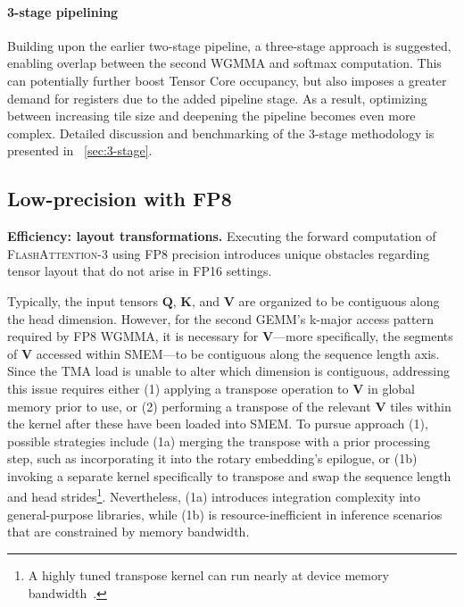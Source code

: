 \begin{enumerate}
\begin{algorithm}[H]
\begin{algorithmic}[1]
\paragraph{3-stage pipelining} Building upon the earlier two-stage pipeline, a three-stage approach is suggested, enabling overlap between the second WGMMA and softmax computation. This can potentially further boost Tensor Core occupancy, but also imposes a greater demand for registers due to the added pipeline stage. As a result, optimizing between increasing tile size and deepening the pipeline becomes even more complex. Detailed discussion and benchmarking of the 3-stage methodology is presented in ~\cref{sec:3-stage}.

\subsection{Low-precision with FP8}
\label{sec:algofp8}

\textbf{Efficiency: layout transformations.} Executing the forward computation of \textsc{FlashAttention-3} using FP8 precision introduces unique obstacles regarding tensor layout that do not arise in FP16 settings.

Typically, the input tensors $\mathbf{Q}$, $\mathbf{K}$, and $\mathbf{V}$ are organized to be contiguous along the head dimension. However, for the second GEMM’s k-major access pattern required by FP8 WGMMA, it is necessary for $\mathbf{V}$—more specifically, the segments of $\mathbf{V}$ accessed within SMEM—to be contiguous along the sequence length axis. Since the TMA load is unable to alter which dimension is contiguous, addressing this issue requires either (1) applying a transpose operation to $\mathbf{V}$ in global memory prior to use, or (2) performing a transpose of the relevant $\mathbf{V}$ tiles within the kernel after these have been loaded into SMEM. To pursue approach (1), possible strategies include (1a) merging the transpose with a prior processing step, such as incorporating it into the rotary embedding’s epilogue, or (1b) invoking a separate kernel specifically to transpose and swap the sequence length and head strides\footnote{A highly tuned transpose kernel can run nearly at device memory bandwidth~\citep{colfax_cutlass_transpose_2024}.}. Nevertheless, (1a) introduces integration complexity into general-purpose libraries, while (1b) is resource-inefficient in inference scenarios that are constrained by memory bandwidth.


\end{algorithmic}
\end{algorithm}
\end{enumerate}
